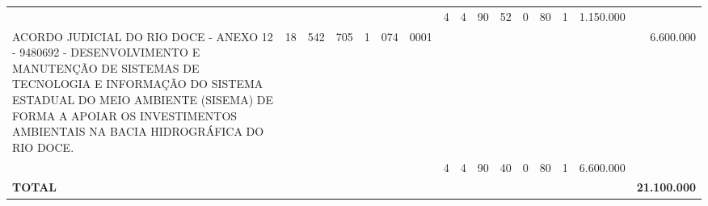 \documentclass{article}
\begin{document}
\begin{longtable}[c]{m{6.5cm}|m{1pt}m{1pt}m{1pt}m{1pt}m{1pt}m{1pt}|m{1pt}m{1pt}m{0.5pt}m{1pt}|m{1pt}|m{1pt}m{1pt}|m{1pt}|m{2pt}}
& & & & & & & \multicolumn{1}{c}{ 4 } & \multicolumn{1}{c}{ 4 } & \multicolumn{1}{c}{ 90 } & \multicolumn{1}{c|}{ 52 } & \multicolumn{1}{c|}{ 0 } & \multicolumn{1}{l}{ 80 } & \multicolumn{1}{c|}{ 1 } & \multicolumn{1}{r|}{ 1.150.000 } & \\
\multicolumn{1}{L{5.5cm}|}{ ACORDO JUDICIAL DO RIO DOCE - ANEXO 12 - 9480692 - DESENVOLVIMENTO E MANUTENÇÃO DE SISTEMAS DE TECNOLOGIA E INFORMAÇÃO DO SISTEMA ESTADUAL DO MEIO AMBIENTE (SISEMA) DE FORMA A APOIAR OS INVESTIMENTOS AMBIENTAIS NA BACIA HIDROGRÁFICA DO RIO DOCE. } & \multicolumn{1}{c}{ 18 } & \multicolumn{1}{c}{ 542 } & \multicolumn{1}{c}{ 705 } & \multicolumn{1}{l}{ 1 } & \multicolumn{1}{c}{ 074 } & \multicolumn{1}{l|}{ 0001 } & & & & & & & & & \multicolumn{1}{r}{ 6.600.000 } \\
& & & & & & & \multicolumn{1}{c}{ 4 } & \multicolumn{1}{c}{ 4 } & \multicolumn{1}{c}{ 90 } & \multicolumn{1}{c|}{ 40 } & \multicolumn{1}{c|}{ 0 } & \multicolumn{1}{l}{ 80 } & \multicolumn{1}{c|}{ 1 } & \multicolumn{1}{r|}{ 6.600.000 } & \\
\hline
\multicolumn{15}{C{6cm}|}{\textbf{ TOTAL }} & \multicolumn{1}{r}{\textbf{ 21.100.000 }} \\
\end{longtable}
\newpage
{}
{}
\renewcommand*{\arraystretch}{1.9}
\scriptsize
\color{myblack}
\centering
\end{document}
